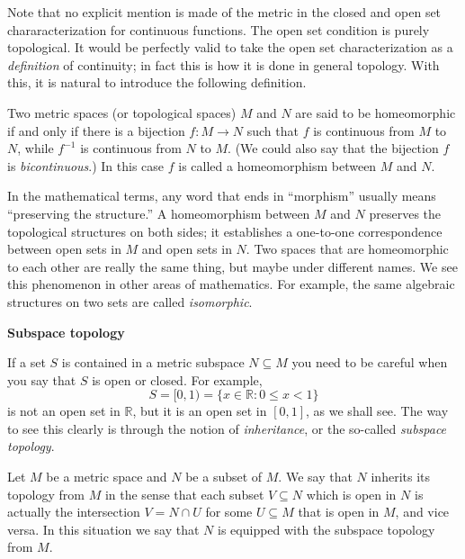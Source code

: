 Note that no explicit mention is made of the metric in the closed and open set chararacterization for continuous functions.
The open set condition is purely topological.
It would be perfectly valid to take the open set characterization as a \textit{definition} of continuity; in fact this is how it is done in general topology.
With this, it is natural to introduce the following definition.

\begin{defn}
  Two metric spaces (or topological spaces) $M$ and $N$ are said to be \textsf{homeomorphic} if and only if there is a bijection $f: M \to N$ such that $f$ is continuous from $M$ to $N$, while $f^{-1}$ is continuous from $N$ to $M$.  (We could also say that the bijection $f$ is \textit{bicontinuous}.)  In this case $f$ is called a \textsf{homeomorphism} between $M$ and $N$. 
\end{defn}

In the mathematical terms, any word that ends in ``morphism'' usually means ``preserving the structure.''
A homeomorphism between $M$ and $N$ preserves the topological structures on both sides; it establishes a one-to-one correspondence between open sets in $M$ and open sets in $N$.
Two spaces that are homeomorphic to each other are really the same thing, but maybe under different names.
We see this phenomenon in other areas of mathematics.
For example, the same algebraic structures on two sets are called \textit{isomorphic}.

\medskip
\noindent\textbf{\large Subspace topology}

If a set $S$ is contained in a metric subspace $N \subseteq M$ you need to be careful when you say that $S$ is open or closed.
For example,
\[
  S = [0,1) = \{ x \in \mathbb{R} \colon 0 \leqslant x < 1 \}
\]
is not an open set in $\mathbb{R}$, but it is an open set in $[0,1]$, as we shall see.
The way to see this clearly is through the notion of \textit{inheritance}, or the so-called \textit{subspace topology}.

\begin{defn}
  Let $M$ be a metric space and $N$ be a subset of $M$.
  We say that $N$ \textsf{inherits its topology} from $M$ in the sense that each subset $V \subseteq N$ which is open in $N$ is actually the intersection $V = N \cap U$ for some $U \subseteq M$ that is open in $M$, and vice versa.
  In this situation we say that $N$ is equipped with the \textsf{subspace topology} from $M$.
\end{defn}

